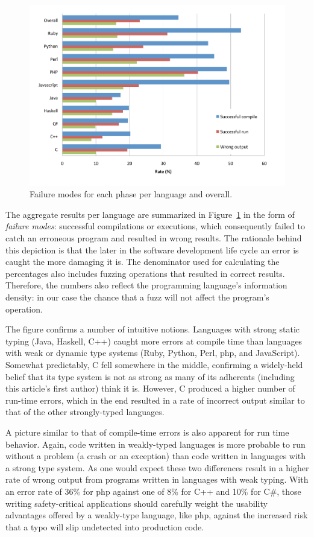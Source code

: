 \documentclass[10pt]{sigplanconf}
\begin{document}
\begin{figure}
        \includegraphics[scale=0.60]{chart}
        \caption{Failure modes for each phase per language and overall.}
        \label{fig:results}
\end{figure}

The aggregate results per language are summarized in Figure~\ref{fig:results}
in the form of {\em failure modes}:
successful compilations or executions, which consequently failed to catch an
erroneous program and resulted in wrong results.
The rationale behind this depiction is that the later in the software
development life cycle an error is caught the more damaging it is.
The denominator used for calculating the percentages also includes
fuzzing operations that resulted in correct results.
Therefore, the numbers also reflect the programming language's
information density:
in our case the chance that a fuzz will not affect the program's operation.

The figure confirms a number of intuitive notions.
Languages with strong static typing \cite{Pie02} (Java, Haskell, C++)
caught more errors at compile time than languages
with weak or dynamic type systems
(Ruby, Python, Perl, {\sc php}, and JavaScript).
Somewhat predictably, C fell somewhere in the middle,
confirming a widely-held belief that its type system is not as strong
as many of its adherents (including this article's first author)
think it is.
However, C produced a higher number of run-time errors,
which in the end resulted in a rate of incorrect output
similar to that of the other strongly-typed languages.

A picture similar to that of compile-time errors
is also apparent for run time behavior.
Again, code written in weakly-typed languages is more probable to run without
a problem (a crash or an exception)
than code written in languages with a strong type system.
As one would expect these two differences result in a higher rate of
wrong output from programs written in languages with weak typing.
With an error rate of 36\% for {\sc php} against one of 8\% for
C++ and 10\% for C\#,
those writing safety-critical applications should carefully
weight the usability advantages offered by a weakly-type language,
like {\sc php}, against the increased risk that a typo
will slip undetected into production code.
\end{document}

